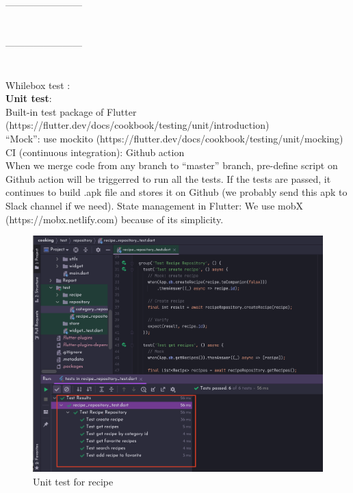 \documentclass{article}
\begin{document}
      ------------------------\\ \\ \\ 
       ------------------------\\ \\ \\
    Whilebox test :   \\
    \textbf{Unit test}: \\
        Built-in test package of Flutter (https://flutter.dev/docs/cookbook/testing/unit/introduction) \\
        “Mock”: use mockito (https://flutter.dev/docs/cookbook/testing/unit/mocking) \\
        CI (continuous integration): Github action \\
        When we merge code from any branch to “master” branch, pre-define script on Github action will be triggerred to run all the tests. If the tests are passed, it continues to build .apk file and stores it on Github (we probably send this apk to Slack channel if we need).
        State management in Flutter: We use mobX (https://mobx.netlify.com) because of its simplicity.\\
    
    \begin{figure}[h!]
            \centering
            \includegraphics[scale=0.3]{Images/image.png}
            \caption{Unit test for recipe }
            \label{fig:cookingbook}
            \end{figure}
            
\end{document}
